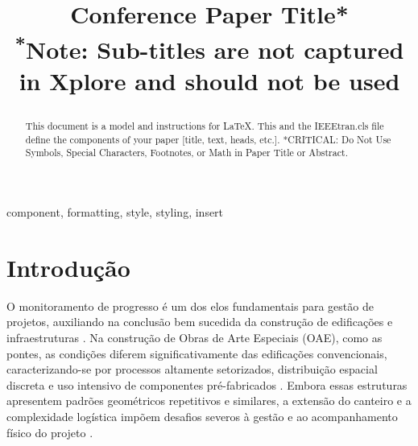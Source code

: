 \documentclass[conference]{IEEEtran}
\begin{document}
\title{Conference Paper Title*\\
{\footnotesize \textsuperscript{*}Note: Sub-titles are not captured in Xplore and
should not be used}

}

\author{
\and
{}

}

\maketitle

\begin{abstract}
This document is a model and instructions for \LaTeX.
This and the IEEEtran.cls file define the components of your paper [title, text, heads, etc.]. *CRITICAL: Do Not Use Symbols, Special Characters, Footnotes, 
or Math in Paper Title or Abstract.
\end{abstract}

\begin{IEEEkeywords}
component, formatting, style, styling, insert
\end{IEEEkeywords}

\section{Introdução}
O monitoramento de progresso é um dos elos fundamentais para gestão de projetos, auxiliando na conclusão bem sucedida da construção de edificações e infraestruturas \cite{Pal2023}. Na construção de Obras de Arte Especiais (OAE), como as pontes, as condições diferem significativamente das edificações convencionais, caracterizando-se por processos altamente setorizados, distribuição espacial discreta e uso intensivo de componentes pré-fabricados \cite{Zhang2025}. Embora essas estruturas apresentem padrões geométricos repetitivos e similares, a extensão do canteiro e a complexidade logística impõem desafios severos à gestão e ao acompanhamento físico do projeto \cite{Zhang2025}.
\end{document}
